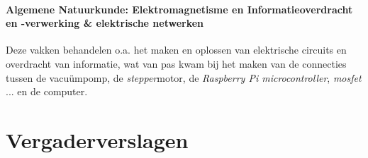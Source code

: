 \documentclass[a4paper,twoside,kulak]{kulakreport} %
\begin{document}
\paragraph{Algemene Natuurkunde: Elektromagnetisme en Informatieoverdracht en -verwerking \& elektrische netwerken}

Deze vakken behandelen o.a. het maken en oplossen van elektrische circuits en overdracht van informatie, wat van pas kwam bij het maken van de connecties tussen de vacuümpomp, de \textit{stepper}motor, de \textit{Raspberry Pi microcontroller}, \textit{mosfet} ... en de computer.

\section*{Vergaderverslagen}






 
\end{document}
